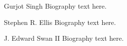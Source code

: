 \documentclass[10pt,journal,compsoc]{IEEEtran}
\begin{document}
\ifCLASSOPTIONcaptionsoff
  \newpage
\fi





\begin{IEEEbiography}{Gurjot Singh}
Biography text here.
\end{IEEEbiography}

\begin{IEEEbiography}{Stephen R. Ellis}
Biography text here.
\end{IEEEbiography}


\begin{IEEEbiography}{J. Edward Swan II}
Biography text here.
\end{IEEEbiography}
\end{document}
